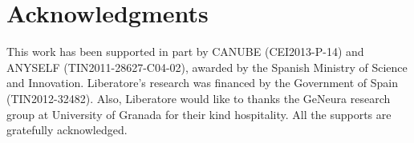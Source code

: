 \documentclass[a4paper]{llncs}
\begin{document}
%
%

\section*{Acknowledgments}
This work has been supported in part by CANUBE (CEI2013-P-14) and ANYSELF (TIN2011-28627-C04-02), awarded by the Spanish Ministry of Science and Innovation. Liberatore's research was financed by the Government of Spain (TIN2012-32482). Also, Liberatore would like to thanks the GeNeura research group at University of Granada for their kind hospitality. All the supports are gratefully acknowledged.



\end{document}
